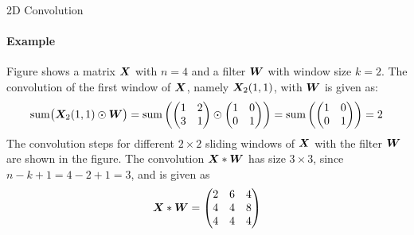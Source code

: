 %
\begin{frame}{2D Convolution}
\framesubtitle{Example}
Figure shows a matrix ${\boldsymbol X}$ with $n=4$ and a
    filter ${\boldsymbol W}$ with window size $k=2$. The convolution of the 
    first window of ${\boldsymbol X}$, namely ${\boldsymbol X}_2(1,1)$, with ${\boldsymbol W}$
    is given as: %
    \begin{align*}
        \operatorname*{sum}\bigl({\boldsymbol X}_2(1,1) \odot {\boldsymbol W}\bigr) = 
        \operatorname*{sum}\left(
            \begin{pmatrix} 1 & 2\\3 & 1 \end{pmatrix} \odot \begin{pmatrix} 1 & 0\\0 & 1 \end{pmatrix}
        \right) = 
        \operatorname*{sum}\left( \begin{pmatrix} 1 & 0\\0& 1 \end{pmatrix}\right)  = 2
    \end{align*}
    The convolution steps for different $2\times 2$ 
    sliding windows of ${\boldsymbol X}$ with the
    filter ${\boldsymbol W}$ are shown in  the figure.
    The convolution ${\boldsymbol X} \ast {\boldsymbol W}$ has size $3 \times 3$, since 
    $n-k+1 = 4-2+1 = 3$, and is
    given as 
\[        {\boldsymbol X} \ast {\boldsymbol W} = \begin{pmatrix} 2 & 6 & 4\\
            4 & 4 & 8\\
            4 & 4 & 4
     \end{pmatrix} \]
\end{frame}
%
%
